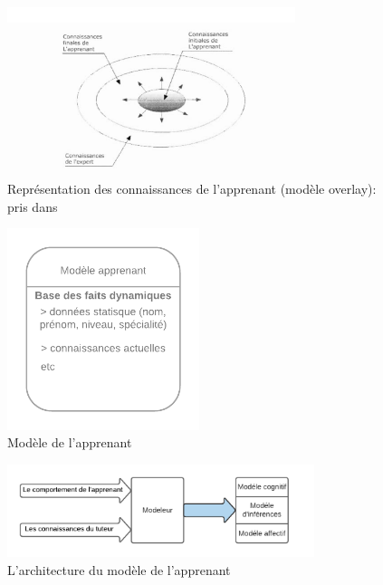 \begin{figure}
    \centering
    \includegraphics[width=0.75\textwidth]{figures/con1.PNG}
    \captionsetup{justification=centering}
    \caption{Représentation des connaissances de l'apprenant (modèle overlay): pris dans \cite{nkambou2010advances}}
    \label{fig:2}
\end{figure}
\newpage 

\begin{figure}
    \centering
    \includegraphics[width=0.5\textwidth]{figures/mod_app.png}
    \captionsetup{justification=centering}
    \caption{ Modèle de l'apprenant }
 \label{fig:m_app}
\end{figure}
\begin{figure}
    \centering
    \includegraphics[width=0.8\textwidth]{figures/md_inf.png}
    \captionsetup{justification=centering}
    \caption{ L'architecture du modèle de l'apprenant }
 \label{fig:2}
\end{figure}



